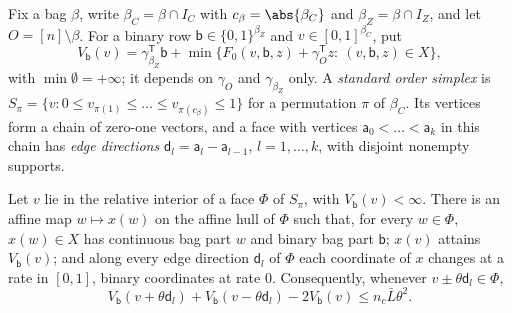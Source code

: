 Fix a bag $\beta$, write $\beta_C=\beta\cap I_C$ with $c_\beta=\abs{\beta_C}$ and
$\beta_Z=\beta\cap I_Z$, and let $O=[n]\setminus\beta$. For a binary row
$\mathsf b\in\{0,1\}^{\beta_Z}$ and $v\in[0,1]^{\beta_C}$, put
\[
 V_{\mathsf b}(v)=\gamma_{\beta_Z}^{\mathsf T}\mathsf b+\min\bigl\{F_0(v,\mathsf
 b,z)+\gamma_O^{\mathsf T}z:\ (v,\mathsf b,z)\in X\bigr\},
\]
with $\min\emptyset=+\infty$; it depends on $\gamma_O$ and $\gamma_{\beta_Z}$
only. A \emph{standard order simplex} is
$S_\pi=\{v:0\le v_{\pi(1)}\le\dots\le v_{\pi(c_\beta)}\le1\}$ for a permutation
$\pi$ of $\beta_C$. Its vertices form a chain of zero-one vectors, and a face
with vertices $\mathsf a_0<\dots<\mathsf a_k$ in this chain has \emph{edge
directions} $\mathsf d_l=\mathsf a_l-\mathsf a_{l-1}$, $l=1,\dots,k$, with
disjoint nonempty supports.

\begin{lemma}\label{lem:con:transport}
Let $v$ lie in the relative interior of a face $\Phi$ of $S_\pi$, with
$V_{\mathsf b}(v)<\infty$. There is an affine map $w\mapsto x(w)$ on the
affine hull of $\Phi$ such that, for every $w\in\Phi$, $x(w)\in X$ has
continuous bag part $w$ and binary bag part $\mathsf b$; $x(v)$ attains
$V_{\mathsf b}(v)$; and along every edge direction $\mathsf d_l$ of $\Phi$ each
coordinate of $x$ changes at a rate in $[0,1]$, binary coordinates at rate
$0$. Consequently, whenever $v\pm\theta\mathsf d_l\in\Phi$,
\[
 V_{\mathsf b}(v+\theta\mathsf d_l)+V_{\mathsf b}(v-\theta\mathsf d_l)
 -2V_{\mathsf b}(v)\le n_c\bar L\theta^2 .
\]
\end{lemma}

